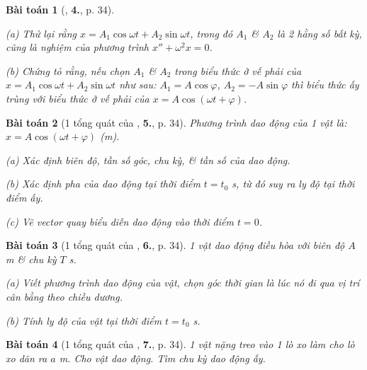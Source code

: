 \documentclass{article}
\numberwithin{equation}{section}
\newtheorem{baitoan}{Bài toán}[section]
\begin{document}
\begin{baitoan}[\cite{SGK_Vat_Ly_12_nang_cao}, \textbf{4.}, p. 34]
	\begin{enumerate*}
		\item[(a)] Thử lại rằng $x = A_1\cos\omega t + A_2\sin\omega t$, trong đó $A_1$ \& $A_2$ là 2 hằng số bất kỳ, cũng là nghiệm của phương trình $x'' + \omega^2x = 0$.
		\item[(b)] Chứng tỏ rằng, nếu chọn $A_1$ \& $A_2$ trong biểu thức ở vế phải của $x = A_1\cos\omega t + A_2\sin\omega t$ như sau: $A_1 = A\cos\varphi$, $A_2 = -A\sin\varphi$ thì biểu thức ấy trùng với biểu thức ở vế phải của $x = A\cos(\omega t + \varphi)$.
	\end{enumerate*}
\end{baitoan}

\begin{baitoan}[1 tổng quát của \cite{SGK_Vat_Ly_12_nang_cao}, \textbf{5.}, p. 34]
	Phương trình dao động của 1 vật là: $x = A\cos(\omega t + \varphi)$ (m).
	\begin{enumerate*}
		\item[(a)] Xác định biên độ, tần số góc, chu kỳ, \& tần số của dao động.
		\item[(b)] Xác định pha của dao động tại thời điểm $t = t_0$ s, từ đó suy ra ly độ tại thời điểm ấy.
		\item[(c)] Vẽ vector quay biểu diễn dao động vào thời điểm $t = 0$.
	\end{enumerate*}
\end{baitoan}

\begin{baitoan}[1 tổng quát của \cite{SGK_Vat_Ly_12_nang_cao}, \textbf{6.}, p. 34]
	1 vật dao động điều hòa với biên độ $A$ m \& chu kỳ $T$ s.
	\begin{enumerate*}
		\item[(a)] Viết phương trình dao động của vật, chọn góc thời gian là lúc nó đi qua vị trí cân bằng theo chiều dương.
		\item[(b)] Tính ly độ của vật tại thời điểm $t = t_0$ s.
	\end{enumerate*}
\end{baitoan}

\begin{baitoan}[1 tổng quát của \cite{SGK_Vat_Ly_12_nang_cao}, \textbf{7.}, p. 34]
	1 vật nặng treo vào 1 lò xo làm cho lò xo dãn ra $a$ m. Cho vật dao động. Tìm chu kỳ dao động ấy.
\end{baitoan}
\end{document}
